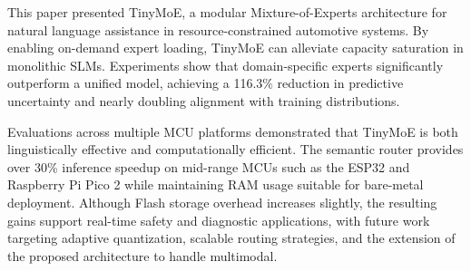 \documentclass[conference]{IEEEtran}
\begin{document}
This paper presented TinyMoE, a modular Mixture-of-Experts architecture for natural language assistance in resource-constrained automotive systems. By enabling on-demand expert loading, TinyMoE can alleviate capacity saturation in monolithic SLMs. Experiments show that domain-specific experts significantly outperform a unified model, achieving a 116.3\% reduction in predictive uncertainty and nearly doubling alignment with training distributions.

Evaluations across multiple MCU platforms demonstrated that TinyMoE is both linguistically effective and computationally efficient. The semantic router provides over 30\% inference speedup on mid-range MCUs such as the ESP32 and Raspberry Pi Pico 2 while maintaining RAM usage suitable for bare-metal deployment. Although Flash storage overhead increases slightly, the resulting gains support real-time safety and diagnostic applications, with future work targeting adaptive quantization, scalable routing strategies, and the extension of the proposed architecture to handle multimodal.




\end{document}
